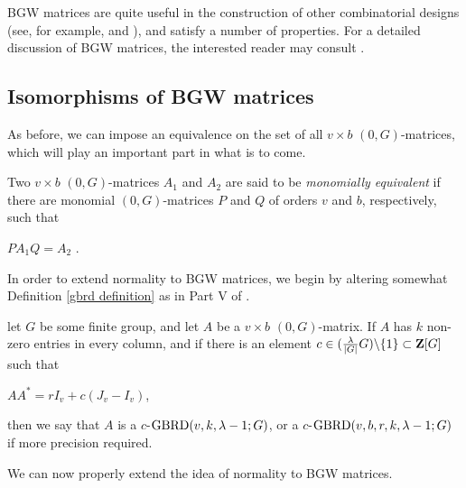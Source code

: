 \documentclass[../../../main]{subfiles}
\begin{document}
BGW matrices are quite useful in the construction of other combinatorial designs
(see, for example, \citeauthor{ionin-kharaghani-drad}
\citeyear{ionin-kharaghani-drad} and \citeyear{ionin-kharaghani-srg}), and
satisfy a number of properties. For a detailed discussion of BGW matrices, the
interested reader may consult \cite{combinatorics-of-symmetric-designs}.

\dinkus


\subsection{Isomorphisms of BGW matrices}

As before, we can impose an equivalence on the set of all $v \times b$ $(0,G)$-matrices, which will play an important part in what is to come. 

\begin{defin}\label{monomial-equiv}
  Two $v \times b$ $(0,G)$-matrices $A_1$ and $A_2$ are said to be {\it monomially equivalent} if there are monomial $(0,G)$-matrices $P$ and $Q$ of orders $v$ and $b$, respectively, such that 
  \begin{defenum}
  \item $PA_1Q=A_2$ .
  \end{defenum}
\end{defin}

 In order to extend normality to BGW matrices, we begin by altering somewhat Definition \ref{gbrd definition} as in Part V of \cite{handbook}.
 
 \begin{defin}\label{c-gbrd defintion}
   let $G$ be some finite group, and let $A$ be a $v \times b$ $(0,G)$-matrix. If $A$ has $k$ non-zero entries in every column, and if there is an element $c \in (\frac{\lambda}{|G|}G)\backslash\{1\} \subset \mathbf{Z}[G]$ such that
  \begin{defenum}
   \item\label{c-gbrd-eq} $AA^* = rI_v + c(J_v - I_v)$,
  \end{defenum}
  then we say that $A$ is a $c$-$\text{GBRD}(v,k,\lambda-1;G)$, or a $c$-$\text{GBRD}(v,b,r,k,\lambda-1;G)$ if more precision required.
 \end{defin}
 
 We can now properly extend the idea of normality to BGW matrices.
 
\end{document}
